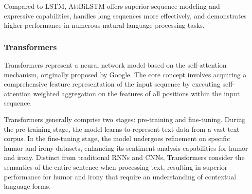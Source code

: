 \documentclass[a4paper]{article}
\begin{document}
Compared to LSTM, AttBiLSTM offers superior sequence modeling and expressive capabilities, handles long sequences more effectively, and demonstrates higher performance in numerous natural language processing tasks.

\subsubsection{Transformers}

Transformers represent a neural network model based on the self-attention mechanism, originally proposed by Google. The core concept involves acquiring a comprehensive feature representation of the input sequence by executing self-attention weighted aggregation on the features of all positions within the input sequence.

Transformers generally comprise two stages: pre-training and fine-tuning. During the pre-training stage, the model learns to represent text data from a vast text corpus. In the fine-tuning stage, the model undergoes refinement on specific humor and irony datasets, enhancing its sentiment analysis capabilities for humor and irony. Distinct from traditional RNNs and CNNs, Transformers consider the semantics of the entire sentence when processing text, resulting in superior performance for humor and irony that require an understanding of contextual language forms.
\end{document}
